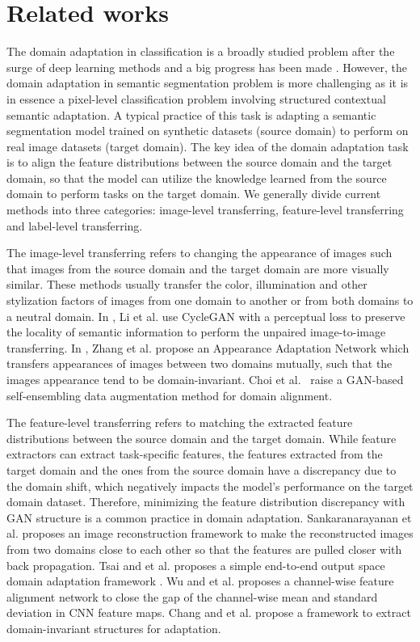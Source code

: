 \documentclass[10pt,twocolumn,letterpaper]{article}
\begin{document}
\section{Related works}
\label{relatedworks}
The domain adaptation in classification is a broadly studied problem after the surge of deep learning methods and a big progress has been made \cite{clsadaptsurvey}. However, the domain adaptation in semantic segmentation problem is more challenging as it is in essence a pixel-level classification problem involving structured contextual semantic adaptation. A typical practice of this task is adapting a semantic segmentation model trained on synthetic datasets \cite{gta,synthia} (source domain) to perform on real image datasets \cite{cityscapes} (target domain). The key idea of the domain adaptation task is to align the feature distributions between the source domain and the target domain, so that the model can utilize the knowledge learned from the source domain to perform tasks on the target domain. We generally divide current methods into three categories: image-level transferring, feature-level transferring and label-level transferring.

The image-level transferring refers to changing the appearance of images such that images from the source domain and the target domain are more visually similar. These methods \cite{bidir, dcan, aan} usually transfer the color, illumination and other stylization factors of images from one domain to another or from both domains to a neutral domain. In \cite{bidir}, Li et al. use CycleGAN \cite{cyclegan} with a perceptual loss to preserve the locality of semantic information to perform the unpaired image-to-image transferring. In \cite{aan}, Zhang et al. propose an Appearance Adaptation Network which transfers appearances of images between two domains mutually, such that the images appearance tend to be domain-invariant. Choi et al.~\cite{selfensemble} raise a GAN-based self-ensembling data augmentation method for domain alignment. 

The feature-level transferring refers to matching the extracted feature distributions between the source domain and the target domain. While feature extractors \cite{vgg, resnet, densenet} can extract task-specific features, the features extracted from the target domain and the ones from the source domain have a discrepancy due to the domain shift, which negatively impacts the model's performance on the target domain dataset. Therefore, minimizing the feature distribution discrepancy with GAN \cite{gan} structure is a common practice in domain adaptation. Sankaranarayanan et al. proposes an image reconstruction framework \cite{Sankaranarayanan} to make the reconstructed images from two domains close to each other so that the features are pulled closer with back propagation. Tsai and et al. proposes a simple end-to-end output space domain adaptation framework \cite{outputspace}. Wu and et al. proposes a channel-wise feature alignment network \cite{dcan} to close the gap of the channel-wise mean and standard deviation in CNN feature maps. Chang and et al. propose a framework \cite{allaboutstructure} to extract domain-invariant structures for adaptation. 
\end{document}
